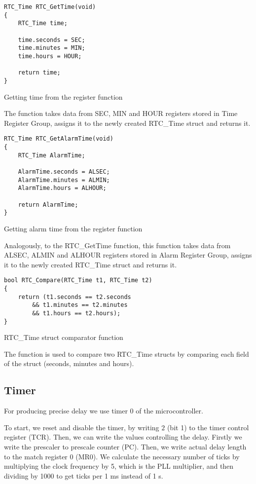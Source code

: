 \documentclass[10pt]{article}
\begin{document}
\begin{program}[H]
	\begin{lstlisting}
RTC_Time RTC_GetTime(void)
{
	RTC_Time time;

	time.seconds = SEC;
	time.minutes = MIN;
	time.hours = HOUR;

	return time;
}
	\end{lstlisting}
	\caption{Getting time from the register function}
\end{program}
The function takes data from SEC, MIN and HOUR registers stored in Time Register Group, assigns it to the newly created RTC\_Time struct and returns it.

\begin{program}[H]
	\begin{lstlisting}
RTC_Time RTC_GetAlarmTime(void)
{
	RTC_Time AlarmTime;

	AlarmTime.seconds = ALSEC;
	AlarmTime.minutes = ALMIN;
	AlarmTime.hours = ALHOUR;

	return AlarmTime;
}
	\end{lstlisting}
	\caption{Getting alarm time from the register function}
\end{program}
Analogously, to the RTC\_GetTime function, this function takes data from ALSEC, ALMIN and ALHOUR registers stored in Alarm Register Group, assigns it to the newly created RTC\_Time struct and returns it.

\begin{program}[H]
	\begin{lstlisting}
bool RTC_Compare(RTC_Time t1, RTC_Time t2)
{
	return (t1.seconds == t2.seconds
		&& t1.minutes == t2.minutes
		&& t1.hours == t2.hours);
}
	\end{lstlisting}
	\caption{RTC\_Time struct comparator function}
\end{program}
The function is used to compare two RTC\_Time structs by comparing each field of the struct (seconds, minutes and hours).

\subsection{Timer}

For producing precise delay we use timer 0 of the microcontroller.
    
To start, we reset and disable the timer, by writing $2$ (bit 1) to the timer control register (TCR). 
Then, we can write the values controlling the delay.
Firstly we write the prescaler to prescale counter (PC).
Then, we write actual delay length to the match register 0 (MR0).
We calculate the necessary number of ticks by multiplying the clock frequency by 5, which is the PLL multiplier, and then dividing by 1000 to get ticks per 1 ms instead of 1 s.
\end{document}
